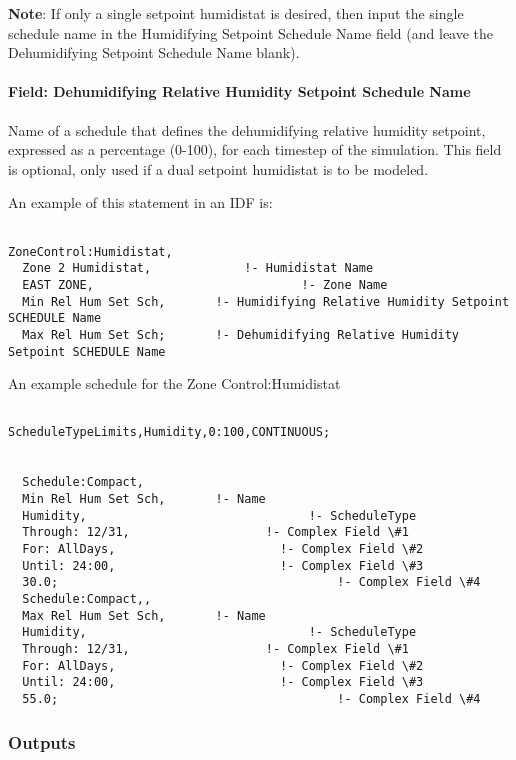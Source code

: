 \textbf{Note}: If only a single setpoint humidistat is desired, then input the single schedule name in the Humidifying Setpoint Schedule Name field (and leave the Dehumidifying Setpoint Schedule Name blank).

\paragraph{Field: Dehumidifying Relative Humidity Setpoint Schedule Name}\label{field-dehumidifying-relative-humidity-setpoint-schedule-name-1}

Name of a schedule that defines the dehumidifying relative humidity setpoint, expressed as a percentage (0-100), for each timestep of the simulation. This field is optional, only used if a dual setpoint humidistat is to be modeled.

An example of this statement in an IDF is:

\begin{lstlisting}

ZoneControl:Humidistat,
  Zone 2 Humidistat,             !- Humidistat Name
  EAST ZONE,                             !- Zone Name
  Min Rel Hum Set Sch,       !- Humidifying Relative Humidity Setpoint SCHEDULE Name
  Max Rel Hum Set Sch;       !- Dehumidifying Relative Humidity Setpoint SCHEDULE Name
\end{lstlisting}

An example schedule for the Zone Control:Humidistat

\begin{lstlisting}

ScheduleTypeLimits,Humidity,0:100,CONTINUOUS;


  Schedule:Compact,
  Min Rel Hum Set Sch,       !- Name
  Humidity,                               !- ScheduleType
  Through: 12/31,                   !- Complex Field \#1
  For: AllDays,                       !- Complex Field \#2
  Until: 24:00,                       !- Complex Field \#3
  30.0;                                       !- Complex Field \#4
  Schedule:Compact,,
  Max Rel Hum Set Sch,       !- Name
  Humidity,                               !- ScheduleType
  Through: 12/31,                   !- Complex Field \#1
  For: AllDays,                       !- Complex Field \#2
  Until: 24:00,                       !- Complex Field \#3
  55.0;                                       !- Complex Field \#4
\end{lstlisting}

\subsubsection{Outputs}\label{outputs-2-027}

